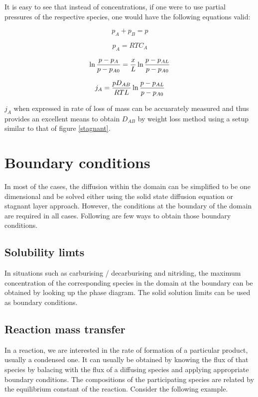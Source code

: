 It is easy to see that instead of concentrations, if one were to use partial
pressures of the respective species, one would have the following  equations
valid:

$$p_A + p_B = p$$

$$p_A = RT C_A$$

$$ \ln {p - p_A \over p - p_{A0}} = {x \over L}  \ln {p - p_{AL} \over p -
p_{A0}} $$

$$ j_A = {p D_{AB} \over RTL} \ln {p - p_{AL} \over p - p_{A0}}$$

$j_A$ when expressed in rate of loss of mass can be accuarately measured and
thus provides an excellent means to obtain $D_{AB}$ by weight loss method using
a setup similar to that of figure \ref{stagnant}.



\section{Boundary conditions}

In most of the cases, the diffusion within the domain can be simplified to be one dimensional and be solved either using the solid state diffusion equation or stagnant layer approach. However, the conditions at the boundary of the domain are required in all cases. Following are few ways to obtain those boundary conditions.

\subsection{Solubility limts}

In situations such as carburising / decarburising and nitriding, the maximum concentration of the corresponding species in the domain at the boundary can be obtained by looking up the phase diagram. The solid solution limits can be used as boundary conditions.

\subsection{Reaction mass transfer}

In a reaction, we are interested in the rate of formation of a particular
product, usually a condensed one. It can usually be obtained by knowing the flux
of that species by balacing with the flux of a diffusing species and applying
appropriate boundary conditions. The compositions of the participating species
are related by the equilibrium constant of the reaction. Consider the following
example.

